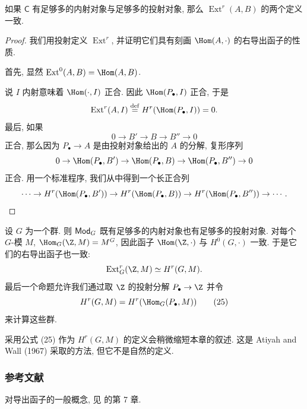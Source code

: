 \begin{proposition}\label{prop:ii.A.13}
如果 $\mathsf{C}$ 有足够多的内射对象与足够多的投射对象, 那么 $\operatorname{Ext}^r(A,B)$ 的两个定义一致.
\end{proposition}

\begin{proof}
我们用投射定义 $\operatorname{Ext}^r$, 并证明它们具有刻画 $\Hom(A,\cdot)$ 的右导出函子的性质.

首先, 显然 $\operatorname{Ext}^0(A,B)=\Hom(A,B)$.

说 $I$ 内射意味着 $\Hom(\cdot,I)$ 正合. 因此 $\Hom(P_\bullet,I)$ 正合, 于是
\[
 \operatorname{Ext}^r(A,I)\stackrel{\mathrm{def}}{=}H^r(\Hom(P_\bullet,I))=0.
\]
最后, 如果
\[
 0\to B'\to B\to B''\to 0
\]
正合, 那么因为 $P_\bullet\to A$ 是由投射对象给出的 $A$ 的分解, 复形序列
\[
 0\to \Hom(P_\bullet,B')\to \Hom(P_\bullet,B)\to \Hom(P_\bullet,B'')\to 0
\]
正合. 用一个标准程序, 我们从中得到一个长正合列
\[
 \cdots\to H^r(\Hom(P_\bullet,B'))\to H^r(\Hom(P_\bullet,B))\to H^r(\Hom(P_\bullet,B''))\to\cdots.
\]
\end{proof}

\begin{example}\label{ex:ii.A.14}
设 $G$ 为一个群. 则 $\mathsf{Mod}_G$ 既有足够多的内射对象也有足够多的投射对象. 对每个 $G$-模 $M$, $\Hom_G(\Z,M)=M^G$, 因此函子 $\Hom(\Z,\cdot)$ 与 $H^0(G,\cdot)$ 一致. 于是它们的右导出函子也一致:
\[
 \operatorname{Ext}_G^r(\Z,M)\simeq H^r(G,M).
\]
最后一个命题允许我们通过取 $\Z$ 的投射分解 $P_\bullet\to\Z$ 并令
\begin{equation*}
 H^r(G,M)=H^r(\Hom_G(P_\bullet,M))
\tag{25}
\end{equation*}
来计算这些群.
\end{example}

\begin{remark}\label{rem:ii.A.15}
采用公式 (25) 作为 $H^r(G,M)$ 的定义会稍微缩短本章的叙述. 这是 Atiyah and Wall (1967) 采取的方法, 但它不是自然的定义.
\end{remark}

\subsubsection*{参考文献}

对导出函子的一般概念, 见 \cite{BucurDeleanu1968} 的第 7 章.

\renewcommand{\thetheorem}{\thesection.\arabic{theorem}}
